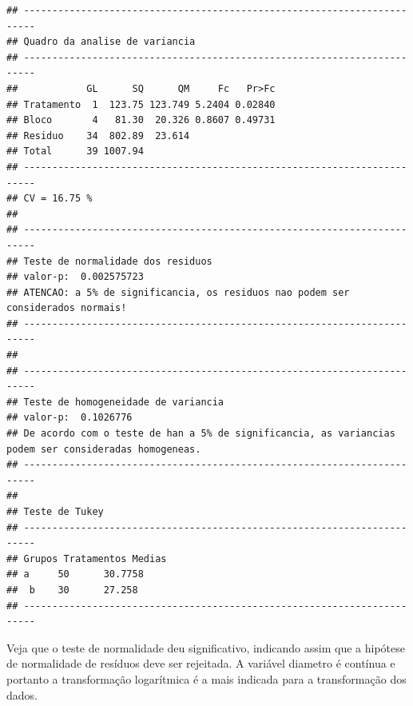 \documentclass[
]{article}
\newenvironment{Shaded}{\begin{snugshade}}{\end{snugshade}}
\newcommand{\DataTypeTok}[1]{\textcolor[rgb]{0.13,0.29,0.53}{#1}}
\newcommand{\KeywordTok}[1]{\textcolor[rgb]{0.13,0.29,0.53}{\textbf{#1}}}
\newcommand{\NormalTok}[1]{#1}
\newcommand{\OperatorTok}[1]{\textcolor[rgb]{0.81,0.36,0.00}{\textbf{#1}}}
\newcommand{\StringTok}[1]{\textcolor[rgb]{0.31,0.60,0.02}{#1}}
\begin{document}
\begin{verbatim}
## ------------------------------------------------------------------------
## Quadro da analise de variancia
## ------------------------------------------------------------------------
##            GL      SQ      QM     Fc   Pr>Fc
## Tratamento  1  123.75 123.749 5.2404 0.02840
## Bloco       4   81.30  20.326 0.8607 0.49731
## Residuo    34  802.89  23.614               
## Total      39 1007.94                       
## ------------------------------------------------------------------------
## CV = 16.75 %
## 
## ------------------------------------------------------------------------
## Teste de normalidade dos residuos 
## valor-p:  0.002575723 
## ATENCAO: a 5% de significancia, os residuos nao podem ser considerados normais!
## ------------------------------------------------------------------------
## 
## ------------------------------------------------------------------------
## Teste de homogeneidade de variancia 
## valor-p:  0.1026776 
## De acordo com o teste de han a 5% de significancia, as variancias podem ser consideradas homogeneas.
## ------------------------------------------------------------------------
## 
## Teste de Tukey
## ------------------------------------------------------------------------
## Grupos Tratamentos Medias
## a     50      30.7758 
##  b    30      27.258 
## ------------------------------------------------------------------------
\end{verbatim}

Veja que o teste de normalidade deu significativo, indicando assim que a hipótese de normalidade de resíduos deve ser rejeitada. A variável diametro é contínua e portanto a transformação logarítmica é a mais indicada para a transformação dos dados.

\begin{Shaded}
\end{Shaded}
\end{document}
